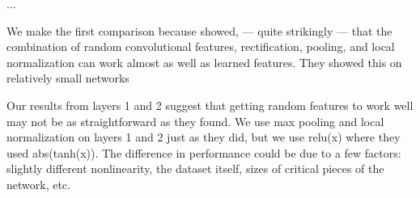 




...

We make the first comparison because \cite{Jarrett-ICCV2009} showed, --- quite strikingly --- that the combination of random convolutional features,  rectification, pooling, and local normalization can work almost as well as learned features. They showed this on relatively small networks 


Our results from layers 1 and 2 suggest that getting random features to work well may not be as straightforward as they found. We use max pooling and local normalization on layers 1 and 2 just as they did, but we use relu(x) where they used abs(tanh(x)). The difference in performance could be due to a few factors: slightly different nonlinearity, the dataset itself, sizes of critical pieces of the network, etc.

